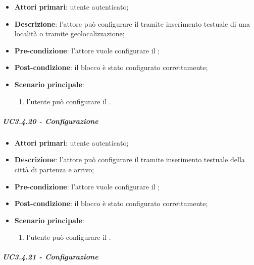 \begin{itemize}
\item \textbf{Attori primari}: utente autenticato;

\item \textbf{Descrizione}: l'attore può configurare il \BCinema{} tramite inserimento testuale di una località o tramite geolocalizzazione;

\item \textbf{Pre-condizione}: l'attore vuole configurare il \BCinema{};

\item \textbf{Post-condizione}:  il blocco è stato configurato correttamente;

\item \textbf{Scenario principale}:
\begin{enumerate}
\item  l'utente può configurare il \BCinema{}.

\end{enumerate}
\end{itemize}

\subparagraph{UC3.4.20 - Configurazione \BTrasporti{}}

\begin{itemize}
\item \textbf{Attori primari}: utente autenticato;

\item \textbf{Descrizione}: l'attore può configurare il \BTrasporti{} tramite inserimento testuale della città di partenza e arrivo;

\item \textbf{Pre-condizione}: l'attore vuole configurare il \BTrasporti{};

\item \textbf{Post-condizione}:  il blocco è stato configurato correttamente;

\item \textbf{Scenario principale}:
\begin{enumerate}
\item  l'utente può configurare il \BTrasporti{}.

\end{enumerate}
\end{itemize}

\subparagraph{UC3.4.21 - Configurazione \BLista{}}

